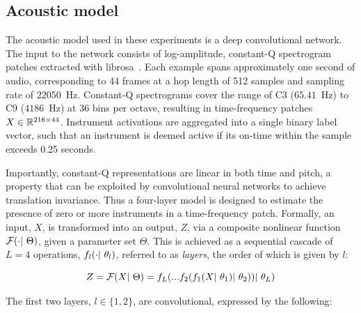 \documentclass{article}
\begin{document}
\subsection{Acoustic model}

%
%

The acoustic model used in these experiments is a deep convolutional network.
The input to the network consists of log-amplitude, constant-Q spectrogram patches extracted with librosa~\cite{librosa}.
Each example spans approximately one second of audio, corresponding to 44 frames at a hop length of 512 samples and sampling rate of $22050$~Hz.
Constant-Q spectrograms cover the range of C3 ($65.41$~Hz) to C9 ($4186$~Hz) at 36 bins
per octave, resulting in time-frequency patches $X \in \mathbb{R}^{216\times44}$.
Instrument activations are aggregated into a single binary label vector, such that an instrument is deemed active if its on-time within the sample exceeds 0.25 seconds.

Importantly, constant-Q representations are linear in both time and pitch, a property that can be exploited by convolutional neural networks to achieve translation invariance.
Thus a four-layer model is designed to estimate the presence of zero or more instruments in a time-frequency patch.
Formally, an input, $X$, is transformed into an output, $Z$, via a composite nonlinear
function $\mathcal{F}(\cdot |~ \Theta)$, given a parameter set $\Theta$.
This is achieved as a sequential cascade of $L=4$ operations, $f_l(\cdot |~ \theta_l)$, referred to as \emph{layers}, the order of which is given by $l$:

\begin{equation}
\label{eq:layers}
Z = \mathcal{F}(X |~ \Theta) = f_{L}(  ... f_2(f_1(X |~ \theta_1) |~ \theta_2) )
 |~ \theta_{L})
\end{equation}


The first two layers, $l \in \{1, 2\}$, are convolutional, expressed by the following:
\end{document}
